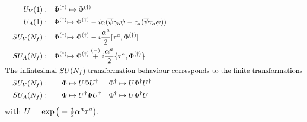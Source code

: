 \begin{subequations}
\begin{align}
         &  & U_V(1): &  & \Phi^{(\dagger)} & \mapsto \Phi^{(\dagger)}                                                              \\
         &  & U_A(1): &  & \Phi^{(\dagger)} & \mathrlap{\mapsto \Phi^{(\dagger)}-\imagu\alpha(\overline{\psi}\gamma_5\psi-\tau_a(\overline{\psi}\tau_a\psi))} &        &                                  \\
         &  & SU_V(N_f): &  & \Phi^{(\dagger)} & \mathrlap{\mapsto \Phi^{(\dagger)}-\imagu\frac{\alpha^a}{2}[\tau^a,\Phi^{(\dagger)}]}  &        &                                                            \\
         &  & SU_A(N_f): &  & \Phi^{(\dagger)} & \mathrlap{\mapsto \Phi^{(\dagger)}\overset{(-)}{+}\imagu\frac{\alpha^a}{2}\{\tau^a,\Phi^{(\dagger)}\}} &        &                                  \\
        \intertext{The infintesimal ${SU(N_f)}$ transformation behaviour corresponds to the finite transformations}
         &  & SU_V(N_f): &  & \Phi & \mapsto U\Phi U^\dagger                                                          &        \Phi^{\dagger} & \mapsto U\Phi^{\dagger}U^\dagger                                  \\
         &  & SU_A(N_f): &  & \Phi             & \mapsto U^\dagger\Phi U^\dagger&\Phi^\dagger&\mapsto U\Phi^\dagger U                 &                                              
    \end{align}
\end{subequations}
with $U=\exp\big(-\frac{{i}}{2}\alpha^a\tau^a)$.



